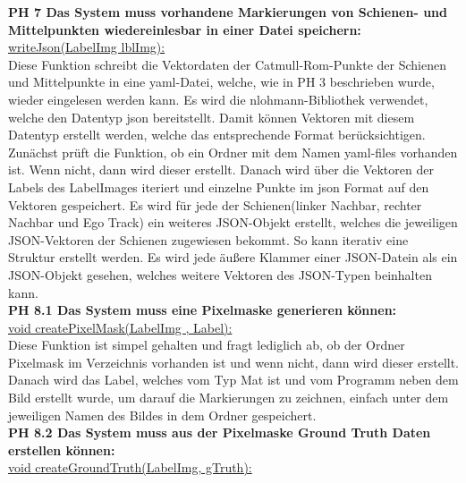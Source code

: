 \noindent
\textbf {PH 7 Das System muss vorhandene Markierungen von Schienen- und Mittelpunkten wiedereinlesbar in einer Datei speichern:}
\\

\noindent
\underline{writeJson(LabelImg lblImg):}
\\

\noindent
Diese Funktion schreibt die Vektordaten der Catmull-Rom-Punkte der Schienen und Mittelpunkte in eine yaml-Datei, welche, wie in PH 3 beschrieben wurde, wieder eingelesen werden kann. Es wird die nlohmann-Bibliothek verwendet, welche den Datentyp json bereitstellt. Damit können Vektoren mit diesem Datentyp erstellt werden, welche das entsprechende Format berücksichtigen. Zunächst prüft die Funktion, ob ein Ordner mit dem Namen yaml-files vorhanden ist. Wenn nicht, dann wird dieser erstellt. Danach wird über die Vektoren der Labels des LabelImages iteriert und einzelne Punkte im json Format auf den Vektoren gespeichert.  Es wird für jede der Schienen(linker Nachbar, rechter Nachbar und Ego Track) ein weiteres JSON-Objekt erstellt, welches die jeweiligen JSON-Vektoren der Schienen zugewiesen bekommt. So kann iterativ eine Struktur erstellt werden. Es wird jede äußere Klammer einer JSON-Datein als ein JSON-Objekt gesehen, welches weitere Vektoren des JSON-Typen beinhalten kann. 
\\

\noindent
\textbf {PH 8.1  Das System muss eine Pixelmaske generieren können:}
\\

\noindent
\underline{ void createPixelMask(LabelImg , Label):}
\\

\noindent
Diese Funktion ist simpel gehalten und fragt lediglich ab, ob der Ordner Pixelmask im Verzeichnis vorhanden ist und wenn nicht, dann wird dieser erstellt. Danach wird das Label, welches vom Typ Mat ist und vom Programm neben dem Bild erstellt wurde, um darauf die Markierungen zu zeichnen, einfach unter dem jeweiligen Namen des Bildes in dem Ordner gespeichert. 
\\

\noindent
\textbf {PH 8.2 Das System muss aus der Pixelmaske Ground Truth Daten erstellen können:}
\\

\noindent
\underline{void createGroundTruth(LabelImg, gTruth):}
\\

